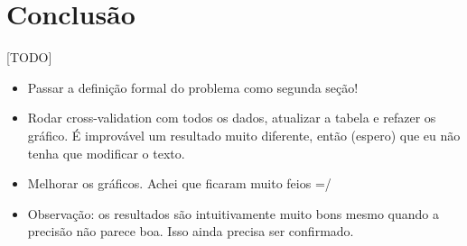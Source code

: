 \documentclass[runningheads,a4paper]{llncs}
\begin{document}
\section{Conclusão} \label{sec:conclusao}

[TODO]
\begin{itemize}
	\item Passar a definição formal do problema como segunda seção!
	\item Rodar cross-validation com todos os dados, atualizar a tabela e refazer os gráfico. É improvável um resultado muito diferente, então (espero) que eu não tenha que modificar o texto.
	\item Melhorar os gráficos. Achei que ficaram muito feios =/
	\item Observação: os resultados são intuitivamente muito bons mesmo quando a precisão não parece boa. Isso ainda precisa ser confirmado.
\end{itemize}



\end{document}
